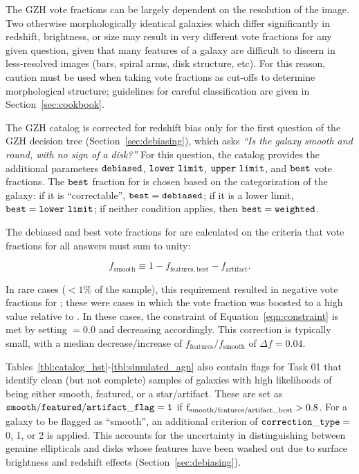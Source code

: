 \documentclass[twocolumn]{aastex6}
\begin{document}
The GZH vote fractions can be largely dependent on the resolution of the image.
Two otherwise morphologically identical galaxies which differ significantly in
redshift, brightness, or size may result in very different vote fractions for
any given question, given that many features of a galaxy are difficult to
discern in less-resolved images (bars, spiral arms, disk structure, etc). For
this reason, caution must be used when taking vote fractions as cut-offs to
determine morphological structure; guidelines for careful classification are
given in Section~\ref{sec:cookbook}. 

The GZH catalog is corrected for redshift bias only for the first
question of the GZH decision tree (Section~\ref{sec:debiasing}), which asks
{\it ``Is the galaxy smooth and round, with no sign of a disk?''} For this
question, the catalog provides the additional parameters $\tt debiased$, $\tt
lower~limit$, $\tt upper~limit$, and $\tt best$ vote fractions. The $\tt best$
fraction for \ffeatures{} is chosen based on the categorization of the galaxy:
if it is ``correctable'', $\tt best = debiased$; if it is a lower limit, $\tt
best = lower~limit$; if neither condition applies, then $\tt best = weighted$.

The debiased and best vote fractions for \fsmooth{} are calculated on the
criteria that vote fractions for all answers must sum to unity:

\begin{equation}
f_\mathrm{smooth} \equiv 1 - f_\mathrm{features,best} - f_\mathrm{artifact}.
\label{eqn:constraint}
\end{equation}

\noindent In rare cases ($<1\%$ of the sample), this requirement resulted in
negative vote fractions for \fsmooth; these were cases in which the
\ffeatures{} vote fraction was boosted to a high value relative to \fartifact.
In these cases, the constraint of Equation~\ref{eqn:constraint} is met by
setting \fsmooth$=0.0$ and decreasing \fbest{} accordingly. This correction is
typically small, with a median decrease/increase of
$f_\mathrm{features}/f_\mathrm{smooth}$ of $\Delta f = 0.04$.

Tables~\ref{tbl:catalog_hst}-\ref{tbl:simulated_agn} also contain flags for
Task 01 that identify clean (but not complete) samples of galaxies with high
likelihoods of being either smooth, featured, or a star/artifact.  These are
set as $\tt smooth/featured/artifact\_flag=1$ if $\rm
f_{smooth/features/artifact\_best}>0.8$. For a galaxy to be flagged as
``smooth'', an additional criterion of $\tt correction\_type =~$0, 1, or 2 is
applied. This accounts for the uncertainty in distinguishing between genuine
ellipticals and disks whose features have been washed out due to surface
brightness and redshift effects (Section~\ref{sec:debiasing}).
\end{document}
